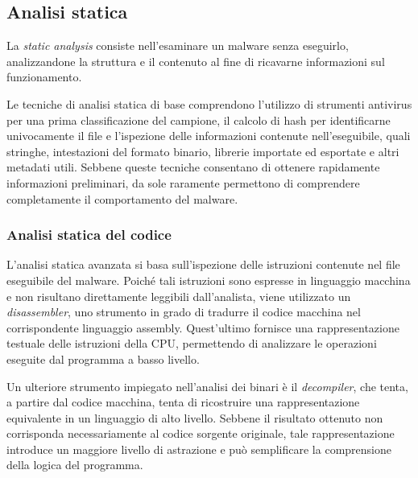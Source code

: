 
\subsection{Analisi statica} %

La \textit{static analysis} consiste nell'esaminare un malware senza eseguirlo, analizzandone la struttura e il contenuto al fine di ricavarne informazioni sul funzionamento.

Le tecniche di analisi statica di base comprendono l'utilizzo di strumenti antivirus per una prima classificazione del campione, il calcolo di hash per identificarne univocamente il file e l'ispezione delle informazioni contenute nell'eseguibile, quali stringhe, intestazioni del formato binario, librerie importate ed esportate e altri metadati utili. Sebbene queste tecniche consentano di ottenere rapidamente informazioni preliminari, da sole raramente permettono di comprendere completamente il comportamento del malware.

\subsubsection{Analisi statica del codice}

L'analisi statica avanzata si basa sull'ispezione delle istruzioni contenute nel file eseguibile del malware. Poiché tali istruzioni sono espresse in linguaggio macchina e non risultano direttamente leggibili dall'analista, viene utilizzato un \textit{disassembler}, uno strumento in grado di tradurre il codice macchina nel corrispondente linguaggio assembly. Quest'ultimo fornisce una rappresentazione testuale delle istruzioni della CPU, permettendo di analizzare le operazioni eseguite dal programma a basso livello.

Un ulteriore strumento impiegato nell'analisi dei binari è il \textit{decompiler}, che tenta, a partire dal codice macchina, tenta di ricostruire una rappresentazione equivalente in un linguaggio di alto livello. Sebbene il risultato ottenuto non corrisponda necessariamente al codice sorgente originale, tale rappresentazione introduce un maggiore livello di astrazione e può semplificare la comprensione della logica del programma.

